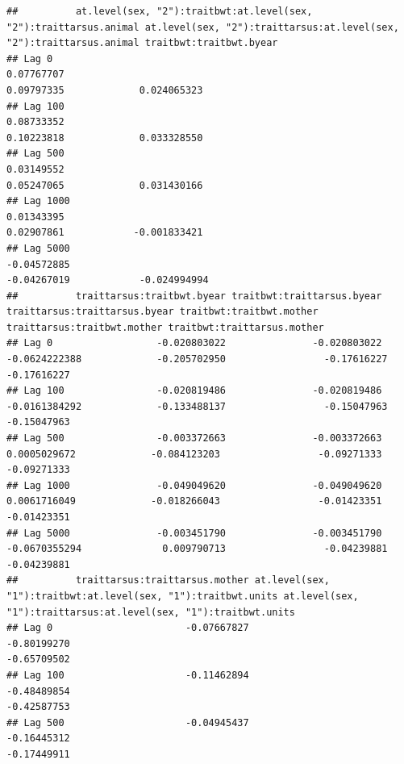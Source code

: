 \documentclass[
  12pt,
]{book}
\begin{document}
\begin{verbatim}
##          at.level(sex, "2"):traitbwt:at.level(sex, "2"):traittarsus.animal at.level(sex, "2"):traittarsus:at.level(sex, "2"):traittarsus.animal traitbwt:traitbwt.byear
## Lag 0                                                           0.07767707                                                           0.09797335             0.024065323
## Lag 100                                                         0.08733352                                                           0.10223818             0.033328550
## Lag 500                                                         0.03149552                                                           0.05247065             0.031430166
## Lag 1000                                                        0.01343395                                                           0.02907861            -0.001833421
## Lag 5000                                                       -0.04572885                                                          -0.04267019            -0.024994994
##          traittarsus:traitbwt.byear traitbwt:traittarsus.byear traittarsus:traittarsus.byear traitbwt:traitbwt.mother traittarsus:traitbwt.mother traitbwt:traittarsus.mother
## Lag 0                  -0.020803022               -0.020803022                 -0.0624222388             -0.205702950                 -0.17616227                 -0.17616227
## Lag 100                -0.020819486               -0.020819486                 -0.0161384292             -0.133488137                 -0.15047963                 -0.15047963
## Lag 500                -0.003372663               -0.003372663                  0.0005029672             -0.084123203                 -0.09271333                 -0.09271333
## Lag 1000               -0.049049620               -0.049049620                  0.0061716049             -0.018266043                 -0.01423351                 -0.01423351
## Lag 5000               -0.003451790               -0.003451790                 -0.0670355294              0.009790713                 -0.04239881                 -0.04239881
##          traittarsus:traittarsus.mother at.level(sex, "1"):traitbwt:at.level(sex, "1"):traitbwt.units at.level(sex, "1"):traittarsus:at.level(sex, "1"):traitbwt.units
## Lag 0                       -0.07667827                                                   -0.80199270                                                      -0.65709502
## Lag 100                     -0.11462894                                                   -0.48489854                                                      -0.42587753
## Lag 500                     -0.04945437                                                   -0.16445312                                                      -0.17449911

\end{verbatim}
\end{document}
